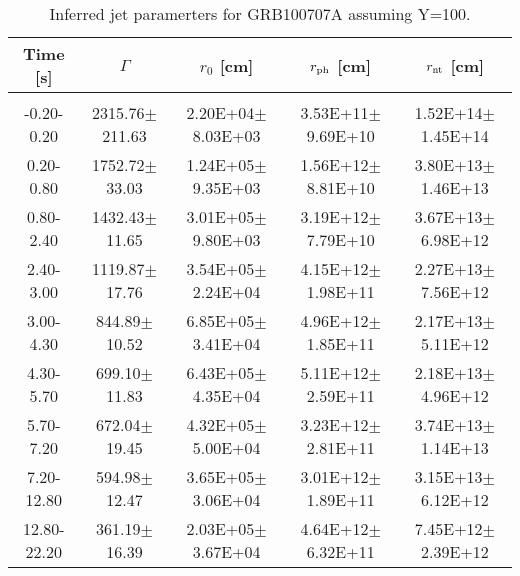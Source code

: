\begin{table}[htp]
\scriptsize
\label{tab:}
\begin{tabular}{c c c c c}
Time [s] & $\Gamma$ & $r_0$ [cm] & $r_{\rm ph}$ [cm] & $r_{\rm nt}$ [cm] \\
\hline \hline\\ 

-0.20-0.20 & 2315.76$\pm$211.63 & 2.20E+04$\pm$8.03E+03 & 3.53E+11$\pm$9.69E+10 & 1.52E+14$\pm$1.45E+14 \\ 

0.20-0.80 & 1752.72$\pm$33.03 & 1.24E+05$\pm$9.35E+03 & 1.56E+12$\pm$8.81E+10 & 3.80E+13$\pm$1.46E+13 \\ 

0.80-2.40 & 1432.43$\pm$11.65 & 3.01E+05$\pm$9.80E+03 & 3.19E+12$\pm$7.79E+10 & 3.67E+13$\pm$6.98E+12 \\ 

2.40-3.00 & 1119.87$\pm$17.76 & 3.54E+05$\pm$2.24E+04 & 4.15E+12$\pm$1.98E+11 & 2.27E+13$\pm$7.56E+12 \\ 

3.00-4.30 & 844.89$\pm$10.52 & 6.85E+05$\pm$3.41E+04 & 4.96E+12$\pm$1.85E+11 & 2.17E+13$\pm$5.11E+12 \\ 

4.30-5.70 & 699.10$\pm$11.83 & 6.43E+05$\pm$4.35E+04 & 5.11E+12$\pm$2.59E+11 & 2.18E+13$\pm$4.96E+12 \\ 

5.70-7.20 & 672.04$\pm$19.45 & 4.32E+05$\pm$5.00E+04 & 3.23E+12$\pm$2.81E+11 & 3.74E+13$\pm$1.14E+13 \\ 

7.20-12.80 & 594.98$\pm$12.47 & 3.65E+05$\pm$3.06E+04 & 3.01E+12$\pm$1.89E+11 & 3.15E+13$\pm$6.12E+12 \\ 

12.80-22.20 & 361.19$\pm$16.39 & 2.03E+05$\pm$3.67E+04 & 4.64E+12$\pm$6.32E+11 & 7.45E+12$\pm$2.39E+12 \\ 

\end{tabular}
\caption{Inferred jet paramerters for GRB100707A assuming Y=100.}
\end{table}
